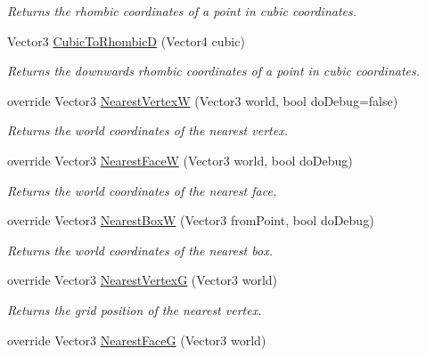 \begin{DoxyCompactItemize}
\begin{DoxyCompactList}\small\item\em Returns the rhombic coordinates of a point in cubic coordinates.\end{DoxyCompactList}\item 
Vector3 \hyperlink{class_g_f_hex_grid_a9f918153c4d8b1092bb5b32c91e88ee5_a9f918153c4d8b1092bb5b32c91e88ee5}{Cubic\+To\+Rhombic\+D} (Vector4 cubic)
\begin{DoxyCompactList}\small\item\em Returns the downwards rhombic coordinates of a point in cubic coordinates.\end{DoxyCompactList}\item 
override Vector3 \hyperlink{class_g_f_hex_grid_aa3e803a3567facf12848c80698ae72ae_aa3e803a3567facf12848c80698ae72ae}{Nearest\+Vertex\+W} (Vector3 world, bool do\+Debug=false)
\begin{DoxyCompactList}\small\item\em Returns the world coordinates of the nearest vertex.\end{DoxyCompactList}\item 
override Vector3 \hyperlink{class_g_f_hex_grid_ad8c205a56bc277236e0c3d1c6cb44845_ad8c205a56bc277236e0c3d1c6cb44845}{Nearest\+Face\+W} (Vector3 world, bool do\+Debug)
\begin{DoxyCompactList}\small\item\em Returns the world coordinates of the nearest face.\end{DoxyCompactList}\item 
override Vector3 \hyperlink{class_g_f_hex_grid_a58ce4a0c91753d5457c4df0ebaac90a9_a58ce4a0c91753d5457c4df0ebaac90a9}{Nearest\+Box\+W} (Vector3 from\+Point, bool do\+Debug)
\begin{DoxyCompactList}\small\item\em Returns the world coordinates of the nearest box.\end{DoxyCompactList}\item 
override Vector3 \hyperlink{class_g_f_hex_grid_ae335a549959829d91dcede4847d7168f_ae335a549959829d91dcede4847d7168f}{Nearest\+Vertex\+G} (Vector3 world)
\begin{DoxyCompactList}\small\item\em Returns the grid position of the nearest vertex.\end{DoxyCompactList}\item 
override Vector3 \hyperlink{class_g_f_hex_grid_abd6193db6b434b5a2ce3512c45faa0b1_abd6193db6b434b5a2ce3512c45faa0b1}{Nearest\+Face\+G} (Vector3 world)

\end{DoxyCompactItemize}
